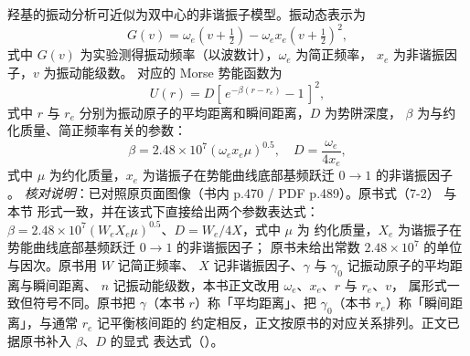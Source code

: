 \begin{principle}
羟基的振动分析可近似为双中心的非谐振子模型。振动态表示为
\begin{equation}
  G(v)=\omega_{e}\!\left(v+\tfrac{1}{2}\right)
       -\omega_{e}x_{e}\!\left(v+\tfrac{1}{2}\right)^{2},
  \label{eq:ch07b-morse-levels}
\end{equation}
式中 $G(v)$ 为实验测得振动频率（以波数计），$\omega_{e}$ 为简正频率，
$x_{e}$ 为非谐振因子，$v$ 为振动能级数。
对应的 Morse 势能函数为
\begin{equation}
  U(r)=D\left[\,e^{-\beta(r-r_{e})}-1\,\right]^{2},
  \label{eq:ch07b-morse}
\end{equation}
式中 $r$ 与 $r_{e}$ 分别为振动原子的平均距离和瞬间距离，$D$ 为势阱深度，
$\beta$ 为与约化质量、简正频率有关的参数：
\begin{equation}
  \beta=2.48\times10^{7}\left(\omega_{e}x_{e}\mu\right)^{0.5},
  \quad D=\frac{\omega_{e}}{4x_{e}},
  \label{eq:ch07b-morse-params}
\end{equation}
式中 $\mu$ 为约化质量，$x_{e}$ 为谐振子在势能曲线底部基频跃迁
$0\to1$ 的非谐振因子
。
\emph{核对说明}：已对照原页面图像（书内 p.470 / PDF p.489）。原书式（7-2）
与本节 形式一致，并在该式下直接给出两个参数表达式：
$\beta=2.48\times10^{7}(W_{e}X_{e}\mu)^{0.5}$、$D=W_{e}/4X$，式中 $\mu$ 为
约化质量，$X_{e}$ 为谐振子在势能曲线底部基频跃迁 $0\to1$ 的非谐振因子；
原书未给出常数 $2.48\times10^{7}$ 的单位与因次。原书用 $W$ 记简正频率、
$X$ 记非谐振因子、$\gamma$ 与 $\gamma_{0}$ 记振动原子的平均距离与瞬间距离、
$n$ 记振动能级数，本书正文改用 $\omega_{e}$、$x_{e}$、$r$ 与 $r_{e}$、$v$，
属形式一致但符号不同。原书把 $\gamma$（本书 $r$）称「平均距离」、把
$\gamma_{0}$（本书 $r_{e}$）称「瞬间距离」，与通常 $r_{e}$ 记平衡核间距的
约定相反，正文按原书的对应关系排列。正文已据原书补入 $\beta$、$D$ 的显式
表达式（）。
\end{principle}

